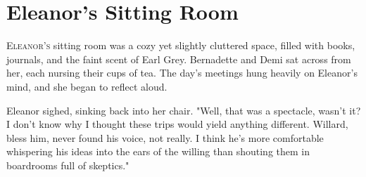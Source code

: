 % 
% 
% 
% 
% 
% 
% 
% 
\section*{Eleanor’s Sitting Room}

\lettrine{E}{leanor’s} sitting room was a cozy yet slightly cluttered space, filled with books, journals, and the faint scent of Earl Grey. Bernadette and Demi sat across from her, each nursing their cups of tea. The day’s meetings hung heavily on Eleanor’s mind, and she began to reflect aloud.

\smallskip

Eleanor sighed, sinking back into her chair. "Well, that was a spectacle, wasn’t it? I don’t know why I thought these trips would yield anything different. Willard, bless him, never found his voice, not really. I think he’s more comfortable whispering his ideas into the ears of the willing than shouting them in boardrooms full of skeptics."
\smallskip

